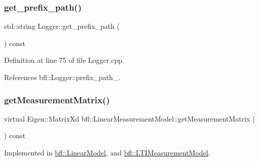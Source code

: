 \subsubsection{\texorpdfstring{get\+\_\+prefix\+\_\+path()}{get\_prefix\_path()}}
{\footnotesize\ttfamily std\+::string Logger\+::get\+\_\+prefix\+\_\+path (\begin{DoxyParamCaption}{ }\end{DoxyParamCaption}) const\hspace{0.3cm}{\ttfamily [inherited]}}



Definition at line 75 of file Logger.\+cpp.



References bfl\+::\+Logger\+::prefix\+\_\+path\+\_\+.

\mbox{\label{classbfl_1_1LinearMeasurementModel_a719734ef024a766f03b86e51dc849953}} 
\subsubsection{\texorpdfstring{get\+Measurement\+Matrix()}{getMeasurementMatrix()}}
{\footnotesize\ttfamily virtual Eigen\+::\+Matrix\+Xd bfl\+::\+Linear\+Measurement\+Model\+::get\+Measurement\+Matrix (\begin{DoxyParamCaption}{ }\end{DoxyParamCaption}) const\hspace{0.3cm}{\ttfamily [pure virtual]}}



Implemented in \mbox{\hyperlink{classbfl_1_1LinearModel_a7dbfa7e8cbdc9ee863febf92e6046400}{bfl\+::\+Linear\+Model}}, and \mbox{\hyperlink{classbfl_1_1LTIMeasurementModel_a2eb547472621fd60e461ae40665daabf}{bfl\+::\+L\+T\+I\+Measurement\+Model}}.

\mbox{\label{classbfl_1_1MeasurementModel_af25f42076b69e0c6cab47d36d796536f}} 
